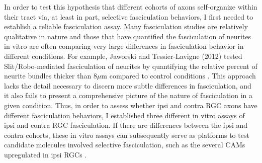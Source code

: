 In order to test this hypothesis that different cohorts of axons self-organize within their tract via, at least in part, selective fasciculation behaviors, I first needed to establish a reliable fasciculation assay.
Many fasciculation studies are relatively qualitative in nature and those that have quantified the fasciculation of neurites in vitro are often comparing very large differences in fasciculation behavior in different conditions.
For example, Jaworski and Tessier-Lavigne (2012) tested Slit/Robo-mediated fasciculation of neurites by quantifying the relative percent of neurite bundles thicker than 8$\mu$m compared to control conditions \cite{jaworski2012autocrine}.
This approach lacks the detail necessary to discern more subtle differences in fasciculation, and it also fails to present a comprehensive picture of the nature of fasciculation in a given condition. 
Thus, in order to assess whether ipsi and contra RGC axons have different fasciculation behaviors, I established three different in vitro assays of ipsi and contra RGC fasciculation.
If there are differences between the ipsi and contra cohorts, these in vitro assays can subsequently serve as platforms to test candidate molecules involved selective fasciculation, such as the several CAMs upregulated in ipsi RGCs \cite{wang2016ipsilateral}.